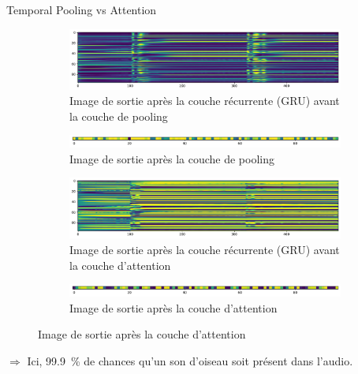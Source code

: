 \documentclass[compress,xcolor=table]{beamer}
\begin{document}
\begin{frame}{Temporal Pooling vs Attention}

    \begin{figure}[ht]
        \centering
        \begin{subfigure}[b]{0.45\textwidth}
            \centering
            \includegraphics[width=\textwidth]{../images/crnn.gru.output.before.pooling.pdf}
            \caption{Image de sortie après la couche récurrente (GRU) avant la couche de pooling}
            \label{fig:crnn.gru.output.before.pooling}
        \end{subfigure}
        \hfill
        \begin{subfigure}[b]{0.45\textwidth}
            \centering
            \includegraphics[width=\textwidth]{../images/crnn.gru.pooling.output.pdf}
            \caption{Image de sortie après la couche de pooling}
            \label{fig:crnn.gru.pooling.output}
        \end{subfigure}

        \vspace{0.5cm}

        \begin{subfigure}[b]{0.45\textwidth}
            \centering
            \includegraphics[width=\textwidth]{../images/crnn.gru.output.before.attention.pdf}
            \caption{Image de sortie après la couche récurrente (GRU) avant la couche d'attention}
            \label{fig:crnn.gru.output.before.attention}
        \end{subfigure}
        \hfill
        \begin{subfigure}[b]{0.45\textwidth}
            \centering
            \includegraphics[width=\textwidth]{../images/crnn.gru.attention.output.pdf}
            \caption{Image de sortie après la couche d'attention}
            \label{fig:crnn.gru.attention.output}
        \end{subfigure}
    \end{figure}

    $\Rightarrow$ Ici, 99.9~\% de chances qu'un son d'oiseau soit présent dans l'audio.

\end{frame}
\end{document}
